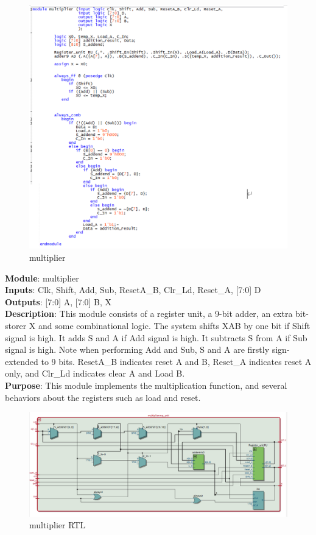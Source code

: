 \documentclass[12pt]{article}
\begin{document}
\begin{figure}[H]
    \centering
    \includegraphics[width=15cm]{multiplier.png}
    \caption{multiplier}
\end{figure}
\textbf{Module}: multiplier \\ 
\textbf{Inputs}: Clk, Shift, Add, Sub, ResetA\_B, Clr\_Ld, Reset\_A, [7:0] D \\ 
\textbf{Outputs}: [7:0] A, [7:0] B, X \\ 
\textbf{Description}: This module consists of a register unit, a 9-bit adder, an extra bit-storer X and some combinational logic. The system shifts XAB by one bit if Shift signal is high. It adds S and A if Add signal is high. It subtracts S from A if Sub signal is high. Note when performing Add and Sub, S and A are firstly sign-extended to 9 bits. ResetA\_B indicates reset A and B, Reset\_A indicates reset A only, and Clr\_Ld indicates clear A and Load B. \\ 
\textbf{Purpose}: This module implements the multiplication function, and several behaviors about the registers such as load and reset. \\
\begin{figure}[H]
    \centering
    \includegraphics[width=15cm]{multiplier_RTL.png}
    \caption{multiplier RTL}
\end{figure}
\end{document}
